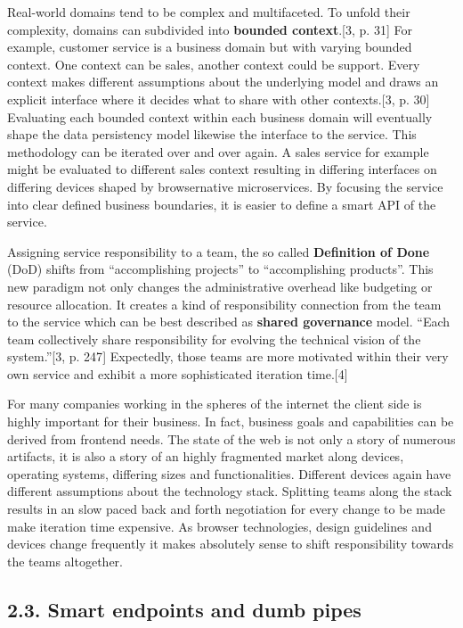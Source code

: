 \documentclass[]{article}
\begin{document}
Real-world domains tend to be complex and multifaceted. To unfold their
complexity, domains can subdivided into \textbf{bounded context}.{[}3,
p. 31{]} For example, customer service is a business domain but with
varying bounded context. One context can be sales, another context could
be support. Every context makes different assumptions about the
underlying model and draws an explicit interface where it decides what
to share with other contexts.{[}3, p. 30{]} Evaluating each bounded
context within each business domain will eventually shape the data
persistency model likewise the interface to the service. This
methodology can be iterated over and over again. A sales service for
example might be evaluated to different sales context resulting in
differing interfaces on differing devices shaped by browsernative
microservices. By focusing the service into clear defined business
boundaries, it is easier to define a smart API of the service.

Assigning service responsibility to a team, the so called
\textbf{Definition of Done} (DoD) shifts from ``accomplishing projects''
to ``accomplishing products''. This new paradigm not only changes the
administrative overhead like budgeting or resource allocation. It
creates a kind of responsibility connection from the team to the service
which can be best described as \textbf{shared governance} model. ``Each
team collectively share responsibility for evolving the technical vision
of the system.''{[}3, p. 247{]} Expectedly, those teams are more
motivated within their very own service and exhibit a more sophisticated
iteration time.{[}4{]}

For many companies working in the spheres of the internet the client
side is highly important for their business. In fact, business goals and
capabilities can be derived from frontend needs. The state of the web is
not only a story of numerous artifacts, it is also a story of an highly
fragmented market along devices, operating systems, differing sizes and
functionalities. Different devices again have different assumptions
about the technology stack. Splitting teams along the stack results in
an slow paced back and forth negotiation for every change to be made
make iteration time expensive. As browser technologies, design
guidelines and devices change frequently it makes absolutely sense to
shift responsibility towards the teams altogether.

\subsection{2.3. Smart endpoints and dumb
pipes}\label{smart-endpoints-and-dumb-pipes}
\end{document}
